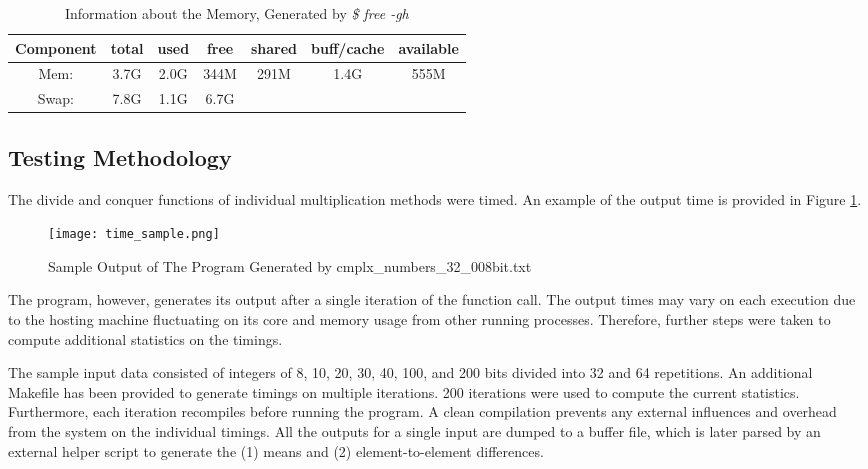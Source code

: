 \documentclass[usletter, 12pt]{article}
\begin{document}
        \begin{table}[h]
            \caption{Information about the Memory, Generated by \textit{\$ free -gh}}
            \centering
            \begin{tabular*}{400pt}{@{\extracolsep{\fill}} ccccccc}

            \textbf{Component} & \textbf{total} & \textbf{used} & \textbf{free} & \textbf{shared} & \textbf{buff/cache} & \textbf{available} \\
            \hline
            Mem: & 3.7G & 2.0G & 344M & 291M & 1.4G & 555M \\
            Swap: & 7.8G & 1.1G & 6.7G & & & \\
            \end{tabular*}
        \end{table}

        \subsection{Testing Methodology}
        The divide and conquer functions of individual multiplication methods were timed. An example of the output time is provided in Figure \ref{time_sample}.

        \begin{figure}[ht]
            \begin{center}
                \texttt{[image: time\_sample.png]}
                \caption{Sample Output of The Program Generated by cmplx\_numbers\_32\_008bit.txt} \label{time_sample}
            \end{center}
        \end{figure}

        The program, however, generates its output after a single iteration of the function call. The output times may vary on each execution due to the hosting machine fluctuating on its core and memory usage from other running processes. Therefore, further steps were taken to compute additional statistics on the timings.

        The sample input data consisted of integers of 8, 10, 20, 30, 40, 100, and 200 bits divided into 32 and 64 repetitions. An additional Makefile has been provided to generate timings on multiple iterations. 200 iterations were used to compute the current statistics. Furthermore, each iteration recompiles before running the program. A clean compilation prevents any external influences and overhead from the system on the individual timings. All the outputs for a single input are dumped to a buffer file, which is later parsed by an external helper script to generate the (1) means and (2) element-to-element differences.
\end{document}
